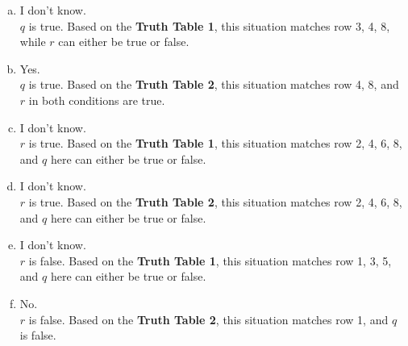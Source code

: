 \documentclass{article}
\def\math#1{$#1$}
\begin{document}
\begin{enumerate}[(a)]
    \item I don't know. \\
\math{q} is true. Based on the \textbf{Truth Table 1}, this situation matches row 3, 4, 8, while \math{r} can either be true or false.
    \item Yes. \\
\math{q} is true. Based on the \textbf{Truth Table 2}, this situation matches row 4, 8, and \math{r} in both conditions are true.
    \item I don't know. \\
\math{r} is true. Based on the \textbf{Truth Table 1}, this situation matches row 2, 4, 6, 8, and \math{q} here can either be true or false.
    \item I don't know. \\
\math{r} is true. Based on the \textbf{Truth Table 2}, this situation matches row 2, 4, 6, 8, and \math{q} here can either be true or false.
    \item I don't know. \\
\math{r} is false. Based on the \textbf{Truth Table 1}, this situation matches row 1, 3, 5, and \math{q} here can either be true or false.
    \item No. \\
\math{r} is false. Based on the \textbf{Truth Table 2}, this situation matches row 1, and \math{q} is false.
\end{enumerate}
\end{document}
